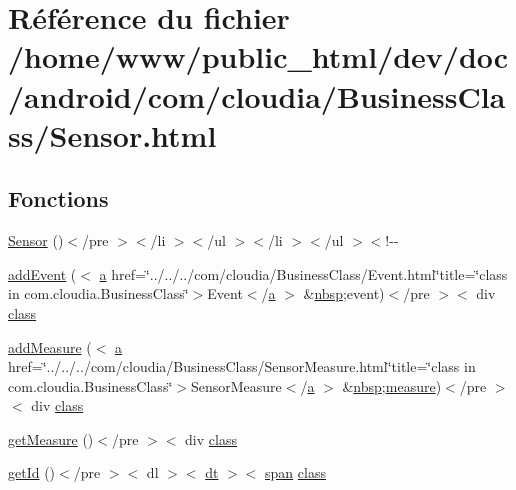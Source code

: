 \hypertarget{_sensor_8html}{\section{Référence du fichier /home/www/public\-\_\-html/dev/doc/android/com/cloudia/\-Business\-Class/\-Sensor.html}
\label{_sensor_8html}
}
\subsection*{Fonctions}
\begin{DoxyCompactItemize}
\item 
\hyperlink{_sensor_8html_a58e7269e663265e8ecd802de859be81f}{Sensor} ()$<$/pre $>$$<$/li $>$$<$/ul $>$$<$/li $>$$<$/ul $>$$<$!-\/-\/
\item 
\hyperlink{_sensor_8html_a406e31430d4491bf75e6919f3782485e}{add\-Event} ($<$ \hyperlink{style_8css_a5e8981582017bb8b84c21f148345d1f7}{a} href=\char`\"{}../../../com/cloudia/Business\-Class/Event.\-html\char`\"{}title=\char`\"{}class in com.\-cloudia.\-Business\-Class\char`\"{}$>$Event$<$/\hyperlink{style_8css_a5e8981582017bb8b84c21f148345d1f7}{a} $>$ \&\hyperlink{_tools_8html_aef915316f784c9063d942974538301a6}{nbsp};event)$<$/pre $>$$<$ div \hyperlink{_tools_8html_acf06f836132665ba8114f5a414c2403f}{class}
\item 
\hyperlink{_sensor_8html_adc2e1a778d5757569bdd6ed8cc80c0e1}{add\-Measure} ($<$ \hyperlink{style_8css_a5e8981582017bb8b84c21f148345d1f7}{a} href=\char`\"{}../../../com/cloudia/Business\-Class/Sensor\-Measure.\-html\char`\"{}title=\char`\"{}class in com.\-cloudia.\-Business\-Class\char`\"{}$>$Sensor\-Measure$<$/\hyperlink{style_8css_a5e8981582017bb8b84c21f148345d1f7}{a} $>$ \&\hyperlink{_tools_8html_aef915316f784c9063d942974538301a6}{nbsp};\hyperlink{index-11_8html_acafc813e7e06597a079f86f5cdd7d5f9}{measure})$<$/pre $>$$<$ div \hyperlink{_tools_8html_acf06f836132665ba8114f5a414c2403f}{class}
\item 
\hyperlink{_sensor_8html_a2635c6340ff0592cd045e631f156d429}{get\-Measure} ()$<$/pre $>$$<$ div \hyperlink{_tools_8html_acf06f836132665ba8114f5a414c2403f}{class}
\item 
\hyperlink{_sensor_8html_ab3a0e513db813f22df2ca23e118d35a9}{get\-Id} ()$<$/pre $>$$<$ dl $>$$<$ \hyperlink{stylesheet_8css_a107565fb4039d33b041380d6e0ea1d80}{dt} $>$$<$ \hyperlink{stylesheet_8css_a8343996ebcf16220b04e54659aac31cc}{span} \hyperlink{_tools_8html_acf06f836132665ba8114f5a414c2403f}{class}
$$
\end{DoxyCompactItemize}
